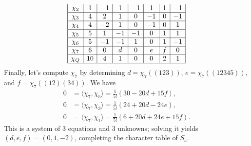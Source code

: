 \begin{exmp}{}
\begin{align*}
\begin{array}{|c|c|c|c|c|c|c|c|}
            \chi_2 & 1                  & -1                   & 1                     & -1                     & 1                       & 1                        & -1                        \\ \hline
            \chi_3 & 4                  & 2                    & 1                     & 0                      & -1                      & 0                        & -1                        \\ \hline
            \chi_4 & 4                  & -2                   & 1                     & 0                      & -1                      & 0                        & 1                         \\ \hline
            \chi_5 & 5                  & 1                    & -1                    & -1                     & 0                       & 1                        & 1                         \\ \hline
            \chi_6 & 5                  & -1                   & -1                    & 1                      & 0                       & 1                        & -1                        \\ \hline
            \chi_7 & 6                  & 0                    & d                     & 0                      & e                       & f                        & 0                         \\ \hline
            \chi_Q & 10                 & 4                    & 1                     & 0                      & 0                       & 2                        & 1                         \\ \hline 
        \end{array} 
    \end{align*}
    Finally, let's compute $\chi_7$ by determining $d = \chi_7((123))$, 
    $e = \chi_7((12345))$, and $f = \chi_7((12)(34))$. We have 
    \begin{align*}
        0 &= \langle \chi_7, \chi_5 \rangle = \frac1{5!}(30 - 20d + 15f), \\ 
        0 &= \langle \chi_7, \chi_3 \rangle = \frac1{5!}(24 + 20d - 24e), \\ 
        0 &= \langle \chi_7, \chi_1 \rangle = \frac1{5!}(6 + 20d + 24e + 15f).
    \end{align*}
    This is a system of $3$ equations and $3$ unknowns; solving it yields 
    $(d, e, f) = (0, 1, -2)$, completing the character table of $S_5$. 
    \begin{align*}
        \begin{array}{|c|c|c|c|c|c|c|c|}

\end{array}
\end{align*}
\end{exmp}
